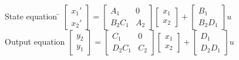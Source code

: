 \begin{tabbing}
State equation \quad \=
$\begin{bmatrix}x_1' \\ x_2'\end{bmatrix} 
     = \begin{bmatrix}
       A_1 & 0 \\ 
       B_2C_1 & A_2
     \end{bmatrix} 
     \begin{bmatrix}
       x_1 \\ 
       x_2
     \end{bmatrix} +
     \begin{bmatrix}
       B_1 \\ 
       B_2D_1
     \end{bmatrix}u$\\
       
Output equation \>
$\begin{bmatrix}y_2 \\ y_1\end{bmatrix} 
     = \begin{bmatrix}
      C_1 & 0 \\ 
      D_2C_1 & C_2
     \end{bmatrix} 
     \begin{bmatrix}
       x_1 \\ 
       x_2
     \end{bmatrix} +
     \begin{bmatrix}
       D_1 \\ 
       D_2D_1
     \end{bmatrix}u$
\end{tabbing}


\newpage

